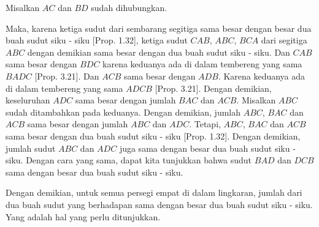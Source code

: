 \documentclass[a4paper]{book}
\begin{document}
Misalkan $AC$ dan $BD$ sudah dihubungkan.

Maka, karena ketiga sudut dari sembarang segitiga sama besar dengan besar
dua buah sudut siku - siku [Prop. 1.32], ketiga sudut $CAB$, $ABC$, $BCA$ dari
segitiga $ABC$ dengan demikian sama besar dengan dua buah sudut siku - siku. 
Dan $CAB$ sama besar dengan $BDC$ karena keduanya ada di dalam tembereng yang
sama $BADC$ [Prop. 3.21]. Dan $ACB$ sama besar dengan $ADB$. Karena keduanya
ada di dalam tembereng yang sama $ADCB$ [Prop. 3.21]. Dengan demikian, 
keseluruhan $ADC$ sama besar dengan jumlah $BAC$ dan $ACB$. Misalkan $ABC$ 
sudah 
ditambahkan pada keduanya. Dengan demikian, jumlah $ABC$, $BAC$ dan $ACB$ sama
besar dengan jumlah $ABC$ dan $ADC$. Tetapi, $ABC$, $BAC$ dan $ACB$ sama besar 
dengan dua buah sudut siku - siku [Prop. 1.32]. Dengan demikian, 
jumlah sudut $ABC$ dan $ADC$ juga sama dengan besar dua buah sudut siku - siku.
Dengan cara yang sama, dapat kita tunjukkan bahwa sudut $BAD$ dan $DCB$ sama 
dengan besar dua buah sudut siku - siku.

Dengan demikian, untuk semua persegi empat di dalam lingkaran, jumlah dari dua
buah sudut yang berhadapan sama dengan besar dua buah sudut siku - siku. Yang 
adalah hal yang perlu ditunjukkan.

\end{document}
